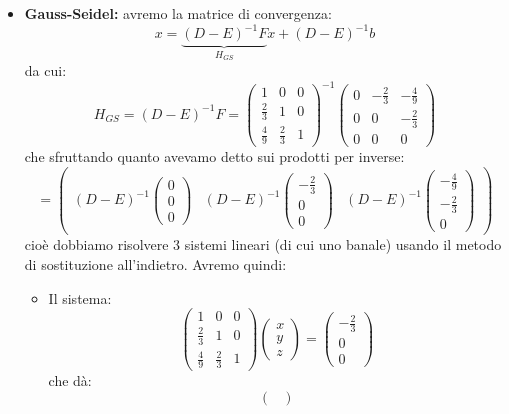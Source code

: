 \documentclass[a4paper,11pt]{article}
\begin{document}
\begin{itemize}
	\item \textbf{Gauss-Seidel:} avremo la matrice di convergenza:
$$
x = \underbrace{(D - E)^{-1} F}_{H_{GS}} x + (D - E)^{-1} b
$$
da cui:
$$
H_{GS} = (D - E)^{-1} F  = \begin{pmatrix}
	1 & 0 & 0 \\ 
	\frac{2}{3} & 1 & 0 \\ 
	\frac{4}{9} & \frac{2}{3} & 1
\end{pmatrix}^{-1}
\begin{pmatrix}
	0 & -\frac{2}{3} & -\frac{4}{9} \\ 
	0 & 0 & -\frac{2}{3} \\ 
	0 & 0 & 0
\end{pmatrix}
$$
che sfruttando quanto avevamo detto sui prodotti per inverse:
$$
= \begin{pmatrix}
(D - E)^{-1} \begin{pmatrix}
	0 \\ 0 \\ 0
\end{pmatrix} & 
(D - E)^{-1} \begin{pmatrix}
	-\frac{2}{3} \\ 0 \\ 0
\end{pmatrix} & 
(D - E)^{-1} \begin{pmatrix}
	-\frac{4}{9} \\ -\frac{2}{3} \\ 0
\end{pmatrix} 
\end{pmatrix} 
$$
cioè dobbiamo risolvere 3 sistemi lineari (di cui uno banale) usando il metodo di sostituzione all'indietro.
Avremo quindi:
\begin{itemize}
	\item Il sistema:
$$
\begin{pmatrix}
	1 & 0 & 0 \\ 
	\frac{2}{3} & 1 & 0 \\ 
	\frac{4}{9} & \frac{2}{3} & 1
\end{pmatrix}
\begin{pmatrix}
	x \\ y \\ z
\end{pmatrix} =
\begin{pmatrix}
	-\frac{2}{3} \\ 0 \\ 0
\end{pmatrix}
$$
che dà:
$$
\begin{pmatrix}

\end{pmatrix}$$
\end{itemize}
\end{itemize}
\end{document}
